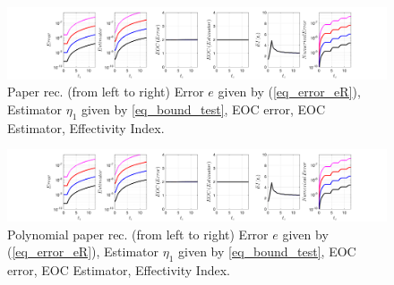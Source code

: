\documentclass[12pt,a4paper]{article}
\numberwithin{equation}{section}
\theoremstyle{definition}
\begin{document}
\begin{figure}[H]
	\hspace{-3cm}
	\includegraphics[scale=0.55]{fig_LeapFrogplots_1x5_sin_IC_harmonic_u8_v2_paperrec}	
	\caption{Paper rec. (from left to right) Error $e$ given by (\ref{eq_error_eR}), Estimator $\eta_1$ given by \ref{eq_bound_test},   EOC error, EOC Estimator, Effectivity Index.}
	\label{fig_all_in_one_paperrec_u08_v02}
\end{figure}
\begin{figure}[H]
	\hspace{-3cm}
	\includegraphics[scale=0.55]{fig_LeapFrogplots_1x5_sin_IC_harmonic_u8_v2_paperrec_poly}	
	\caption{Polynomial paper rec. (from left to right) Error $e$ given by (\ref{eq_error_eR}), Estimator $\eta_1$ given by \ref{eq_bound_test},   EOC error, EOC Estimator, Effectivity Index.}
	\label{fig_all_in_one_paperrec_poly_u08_v02}
\end{figure}
\end{document}

